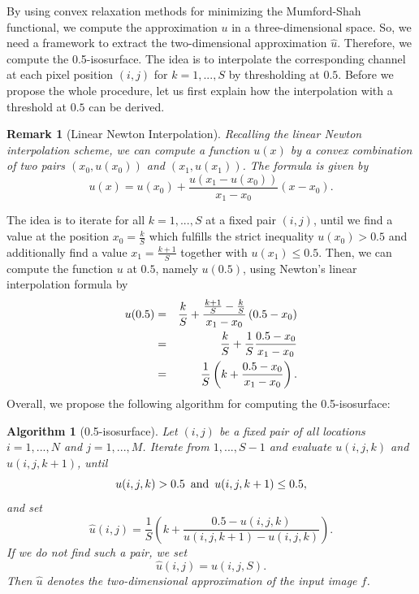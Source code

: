 \documentclass[abstracton]{scrreprt}
\newtheorem{remark}[theorem]{Remark}
\newtheorem{algorithm}[theorem]{Algorithm}
\begin{document}
        By using convex relaxation methods for minimizing the Mumford-Shah functional, we compute the approximation $u$ in a three-dimensional space. So, we need a framework to extract the two-dimensional approximation $\hat{u}$. Therefore, we compute the 0.5-isosurface. The idea is to interpolate the corresponding channel at each pixel position $(i,j)$ for $k = 1, ..., S$ by thresholding at $0.5$. Before we propose the whole procedure, let us first explain how the interpolation with a threshold at $0.5$ can be derived.
        \begin{remark}[Linear Newton Interpolation]
            Recalling the linear Newton interpolation scheme, we can compute a function $u(x)$ by a convex combination of two pairs $(x_{0}, u(x_{0}))$ and $(x_{1}, u(x_{1}))$. The formula is given by
                $$
                    u(x) = u(x_{0}) + \frac{u(x_{1} - u(x_{0}))}{x_{1} - x_{0}}\left( x - x_{0} \right).
                $$
        \end{remark}
        The idea is to iterate for all $k = 1, ..., S$ at a fixed pair $(i,j)$, until we find a value at the position $x_{0} = \frac{k}{S}$ which fulfills the strict inequality $u(x_{0}) > 0.5$ and additionally find a value $x_{1} = \frac{k+1}{S}$ together with $u(x_{1}) \le 0.5$. Then, we can compute the function $u$ at $0.5$, namely $u(0.5)$, using Newton's linear interpolation formula by
            \begin{eqnarray}
                u(0.5) &=& \frac{k}{S} + \frac{\frac{k+1}{S} - \frac{k}{S}}{x_{1} - x_{0}} \left( 0.5 - x_{0} \right) \notag \\
                &=& \frac{k}{S} + \frac{1}{S} \frac{0.5 - x_{0}}{x_{1} - x_{0}} \notag \\
                &=& \frac{1}{S} \left( k + \frac{0.5 - x_{0}}{x_{1} - x_{0}} \right). \notag
            \end{eqnarray}
        Overall, we propose the following algorithm for computing the 0.5-isosurface:
        \begin{algorithm}[0.5-isosurface]
            \label{alg:0.5_isosurface}
            Let $(i,j)$ be a fixed pair of all locations $i = 1, ..., N$ and $j = 1,..., M$. Iterate from $1, ..., S-1$ and evaluate $u(i,j,k)$ and $u(i,j,k+1)$, until
                $$
                    u(i,j,k) > 0.5 \,\,\, \textnormal{and} \,\,\, u(i,j,k+1) \le 0.5,
                $$
            and set
                $$
                    \hat{u}(i,j) = \frac{1}{S} \left( k + \frac{0.5 - u(i,j,k)}{u(i,j,k+1) - u(i,j,k)} \right).
                $$
            If we do not find such a pair, we set
                $$
                    \hat{u}(i,j) = u(i, j, S).
                $$
            Then $\hat{u}$ denotes the two-dimensional approximation of the input image $f$.
        \end{algorithm}
\end{document}
